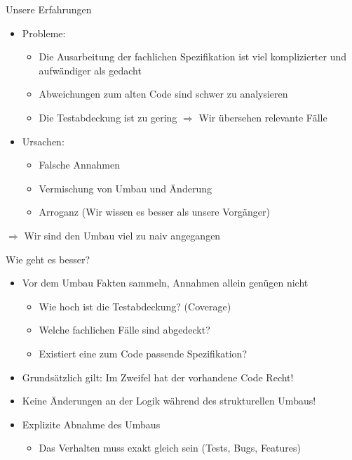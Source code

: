 \begin{frame}[fragile]{Unsere Erfahrungen}
\begin{itemize}
\item Probleme:
\begin{itemize}
\item Die Ausarbeitung der fachlichen Spezifikation ist viel komplizierter und aufwändiger als gedacht
\item Abweichungen zum alten Code sind schwer zu analysieren
\item Die Testabdeckung ist zu gering \newline $\Rightarrow$ Wir übersehen relevante Fälle 
\end{itemize}
\end{itemize}

\begin{itemize}
\item Ursachen:
\begin{itemize}
\item Falsche Annahmen
\item Vermischung von Umbau und Änderung
\item Arroganz (\glqq Wir wissen es besser als unsere Vorgänger\grqq{})
\end{itemize}
\end{itemize}

$\Rightarrow$ Wir sind den Umbau viel zu naiv angegangen

\end{frame}


\begin{frame}[fragile]{Wie geht es besser?}
\begin{itemize}
\item Vor dem Umbau Fakten sammeln, Annahmen allein genügen nicht
\begin{itemize}
\item Wie hoch ist die Testabdeckung? (Coverage)
\item Welche fachlichen Fälle sind abgedeckt?
\item Existiert eine zum Code passende Spezifikation?
\end{itemize}

\item Grundsätzlich gilt: Im Zweifel hat der vorhandene Code Recht!

\item Keine Änderungen an der Logik während des strukturellen Umbaus!

\item Explizite Abnahme des Umbaus
\begin{itemize}
\item Das Verhalten muss exakt gleich sein (Tests, Bugs, Features)
\end{itemize}

\end{itemize}
\end{frame}



